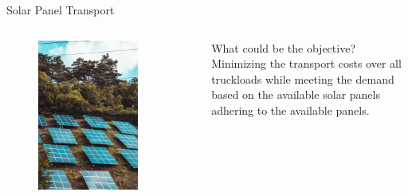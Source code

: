 \documentclass[aspectratio=1610,12pt]{beamer}
\begin{document}
\begin{frame}[fragile]{Solar Panel Transport}
    \label{pic_kindler}
	\begin{columns}[onlytextwidth]
    	\center
    		\begin{figure}
    			\includegraphics[width=0.8\textwidth]{images/moritz-kindler-mRBywMReXH8-unsplash.jpg}
       		\end{figure}
    		\begin{block}{What could be the objective?}
            	\pause
            	Minimizing the transport costs over all truckloads while meeting the demand based on the available solar panels adhering to the available panels.
    		\end{block}
    \end{columns}
\end{frame}
\end{document}
